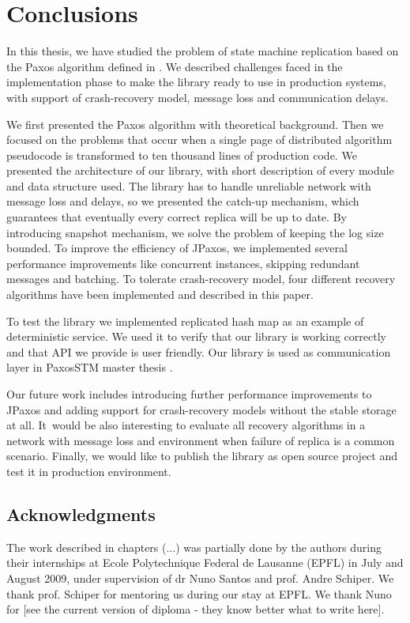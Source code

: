 \chapter{Conclusions}

In this thesis, we have studied the problem of state machine replication based
on the Paxos algorithm defined in \cite{Lam98}. We described challenges faced in
the implementation phase to make the library ready to use in production systems,
with support of crash-recovery model, message loss and communication delays.

We first presented the Paxos algorithm with theoretical background. Then we
focused on the problems that occur when a single page of distributed algorithm pseudocode 
is transformed to ten thousand lines of production code. We presented
the architecture of our library, with short description of every module and data
structure used. The library has to handle unreliable network with message
loss and delays, so we presented the catch-up mechanism, which guarantees that
eventually every correct replica will be up to date. By introducing snapshot
mechanism, we solve the problem of keeping the log size bounded. To improve the efficiency of JPaxos, we implemented several performance improvements like concurrent
instances, skipping redundant messages and batching. To tolerate crash-recovery
model, four different recovery algorithms have been implemented and described in
this paper.

To test the library we implemented replicated hash map as an example of
deterministic service. We used it to verify that our library is working
correctly and that API we provide is user friendly. Our library is used as 
communication layer in PaxosSTM master thesis \cite{Tad10}.

Our future work includes introducing further performance improvements to JPaxos and
adding support for crash-recovery models without the stable storage at all. It~would be also interesting to evaluate all recovery algorithms in a network with
message loss and environment when failure of replica is a common scenario.
Finally, we would like to publish the library as open source project and test it
in production environment.

\section*{Acknowledgments}

The work described in chapters (...) was partially done by the authors during
their internships at Ecole Polytechnique Federal de Lausanne (EPFL) in July and
August 2009, under supervision of dr Nuno Santos and prof. Andre Schiper. We
thank prof. Schiper for mentoring us during our stay at EPFL. We thank Nuno for
[see the current version of diploma - they know better what to write here].

